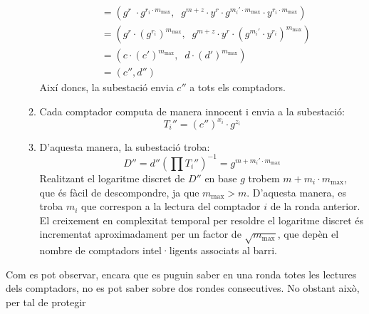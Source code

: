 \begin{enumerate}
\begin{enumerate}
\begin{align*}
		&= ( g^r \; \cdot g^{r_i \cdot m_{\textrm{max}}} , \;\; g^{m + z} \cdot y^r \cdot g^{m_i' \cdot m_{\textrm{max}}} \cdot y^{r_i \cdot m_{\textrm{max}}} )\\
		&= (g^r \cdot (g^{r_i})^{m_{\textrm{max}}}, \;\; g^{m + z} \cdot y^r \cdot (g^{m_i'} \cdot y^{r_i})^{m_{\textrm{max}}} )\\
		&=(c \cdot (c')^{m_{\textrm{max}}}, \;\; d \cdot (d')^{m_{\textrm{max}}})\\
		&=(c'', d'')
		\end{align*}
		Així doncs, la subestació envia $c''$ a tots els comptadors.
		\item Cada comptador computa de manera innocent i envia a la subestació:
		\[T_i'' = (c'')^{x_i} \cdot g^{z_i}\]
		\item D'aquesta manera, la subestació troba:
		\[D'' = d'' (\prod T_i'')^{-1} = g^{m + m_i' \cdot m_{\textrm{max}}}\]
		Realitzant el logaritme discret de $D''$ en base $g$ trobem $m + m_i \cdot m_{\textrm{max}}$, que és fàcil de descompondre, ja que $m_{\textrm{max}} > m$. D'aquesta manera, es troba $m_i$ que correspon a la lectura del comptador $i$ de la ronda anterior.\\
		El creixement en complexitat temporal per resoldre el logaritme discret és incrementat aproximadament per un factor de $\sqrt{m_{\textrm{max}}} $, que depèn el nombre de comptadors intel·ligents associats al barri.
	\end{enumerate}
\end{enumerate}
Com es pot observar, encara que es puguin saber en una ronda totes les lectures dels comptadors, no es pot saber sobre dos rondes consecutives. No obstant això, per tal de protegir 


